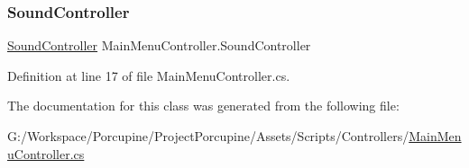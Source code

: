 \subsubsection{\texorpdfstring{Sound\+Controller}{SoundController}}
{\footnotesize\ttfamily \hyperlink{class_sound_controller}{Sound\+Controller} Main\+Menu\+Controller.\+Sound\+Controller\hspace{0.3cm}{\ttfamily [get]}}



Definition at line 17 of file Main\+Menu\+Controller.\+cs.



The documentation for this class was generated from the following file\+:\begin{DoxyCompactItemize}
\item 
G\+:/\+Workspace/\+Porcupine/\+Project\+Porcupine/\+Assets/\+Scripts/\+Controllers/\hyperlink{_main_menu_controller_8cs}{Main\+Menu\+Controller.\+cs}\end{DoxyCompactItemize}
